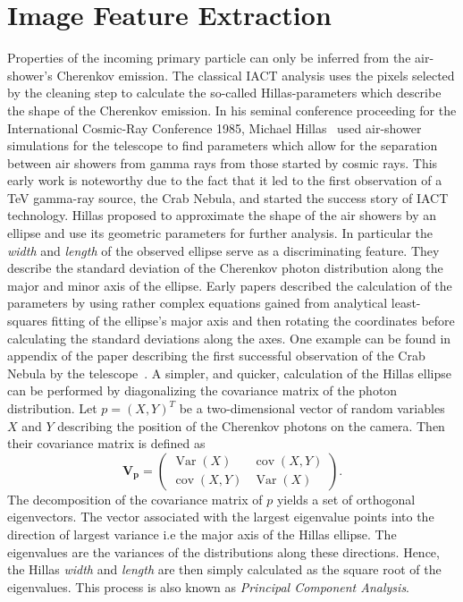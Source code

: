 \section{Image Feature Extraction}
\label{sec:hillas}
\newcommand{\imagerot}{\psi}
Properties of the incoming primary particle can only be inferred from the air-shower's Cherenkov emission. 
The classical IACT analysis uses the pixels selected by the cleaning step to calculate the so-called Hillas-parameters
which describe the shape of the Cherenkov emission.
In his seminal conference proceeding for the International Cosmic-Ray Conference 1985, Michael Hillas~\cite{hillas} used air-shower simulations for the \whipple telescope to find parameters which allow for the
separation between air showers from gamma rays from those started by cosmic rays. This early work is noteworthy due to the fact that it led to the first 
observation of a \si{TeV} gamma-ray source, the Crab Nebula, and started the success story of IACT technology.
Hillas proposed to approximate the shape of the air showers by an ellipse and use its geometric parameters for further analysis.
In particular the \emph{width} and \emph{length} of the observed ellipse serve as a discriminating feature.  
They describe the standard deviation of the Cherenkov photon distribution along the major and minor axis of the ellipse.  
Early papers described the calculation 
of the parameters by using rather complex equations gained from analytical least-squares fitting 
of the ellipse's major axis and then rotating the coordinates before calculating the standard deviations 
along the axes. One example can be found in appendix of the 
paper describing the first successful observation of the Crab Nebula by the \whipple telescope~\cite{whipple_crab}.
A simpler, and quicker, calculation of the Hillas ellipse can be performed by diagonalizing the covariance matrix of the photon distribution.
Let $p = (X, Y)^T$ be a two-dimensional vector of random variables $X$ and $Y$ describing the position of the Cherenkov photons on the camera. 
Then their covariance matrix is defined as
\begin{equation*}
    \mathbf{V_{\mathbf{p}}} = \begin{pmatrix}
                                \operatorname{Var}(X)   & \operatorname{cov}(X, Y) \\
                                \operatorname{cov}(X, Y)& \operatorname{Var}(X)
                            \end{pmatrix}.
\end{equation*}
The decomposition of the covariance matrix of $p$ yields a set of orthogonal eigenvectors.
The vector associated with the largest eigenvalue points into the direction of largest variance i.e the major axis of the Hillas ellipse. 
The eigenvalues are the variances of the distributions along these directions.
Hence, the Hillas \emph{width} and \emph{length} are then simply calculated as the square root of the eigenvalues.   
This process is also known as \emph{Principal Component Analysis}.


